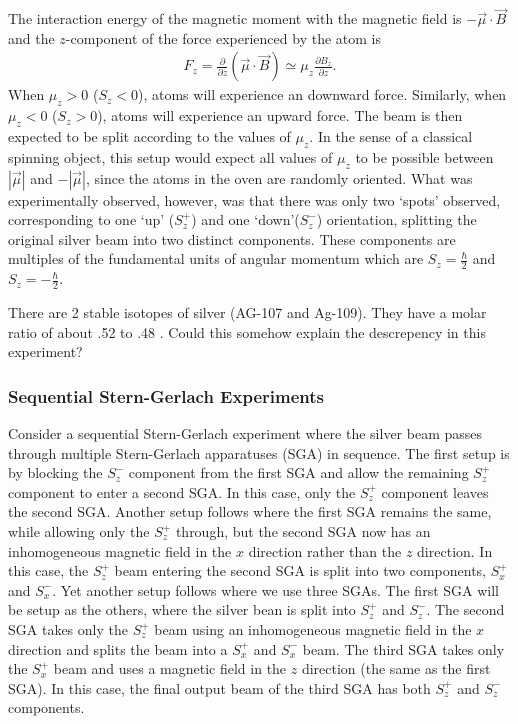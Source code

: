 The interaction energy of the magnetic moment with the magnetic field is $-\vec{\mu}\cdot\vec{B}$ and the $z$-component of the force experienced by the atom is 
\begin{align}
F_z = \frac{\partial}{\partial z}(\vec{\mu}\cdot \vec{B}) \simeq \mu_z \frac{\partial B_z}{\partial z}.
\end{align}
When $\mu_z > 0$ ($S_z < 0$), atoms will experience an downward force. Similarly, when $\mu_z < 0$ ($S_z > 0$), atoms will experience an upward force. The beam is then expected to be split according to the values of $\mu_z$. In the sense of a classical spinning object, this setup would expect all values of $\mu_z$ to be possible between $|\vec{\mu}|$ and $-|\vec{\mu}|$, since the atoms in the oven are randomly oriented. What was experimentally observed, however, was that there was only two `spots' observed, corresponding to one `up' ($S_z^+$) and one `down'($S_z^-$) orientation, splitting the original silver beam into two distinct components. These components are multiples of the fundamental units of angular momentum which are $S_z=\frac{\hbar}{2}$ and $S_z=-\frac{\hbar}{2}$.

\begin{questions}
	\item There are 2 stable isotopes of silver (AG-107 and Ag-109). They have a molar ratio of about .52 to .48 \cite{bib:IUPAC Periodic Table, bib:Table Of Nuclides}. Could this somehow explain the descrepency in this experiment? 
\end{questions}

\subsubsection{Sequential Stern-Gerlach Experiments}

Consider a sequential Stern-Gerlach experiment where the silver beam passes through multiple Stern-Gerlach apparatuses (SGA) in sequence. The first setup is by blocking the $S_z^-$ component from the first SGA and allow the remaining $S_z^+$ component to enter a second SGA. In this case, only the $S_z^+$ component leaves the second SGA. Another setup follows where the first SGA remains the same, while allowing only the $S_z^+$ through, but the second SGA now has an inhomogeneous magnetic field in the $x$ direction rather than the $z$ direction. In this case, the $S_z^+$ beam entering the second SGA is split into two components, $S_x^+$ and $S_x^-$. Yet another setup follows where we use three SGAs. The first SGA will be setup as the others, where the silver bean is split into $S_z^+$ and $S_z^-$. The second SGA takes only the $S_z^+$ beam using an inhomogeneous magnetic field in the $x$ direction and splits the beam into a $S_x^+$ and $S_x^-$ beam. The third SGA takes only the $S_x^+$ beam and uses a magnetic field in the $z$ direction (the same as the first SGA). In this case, the final output beam of the third SGA has both $S_z^+$ and $S_z^-$ components.

